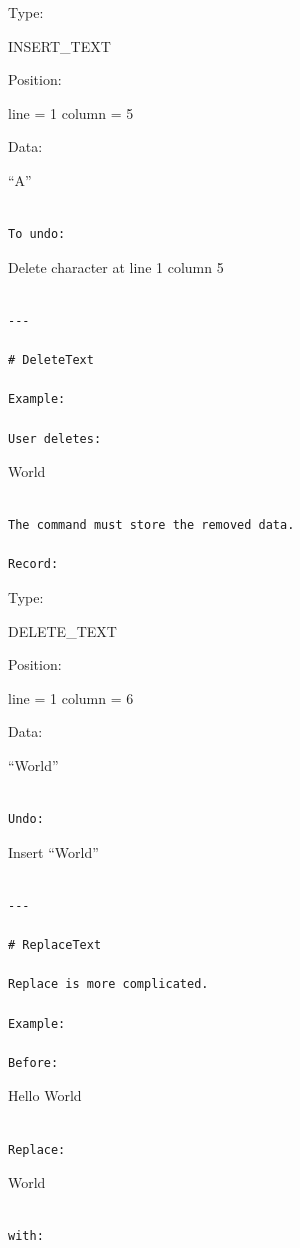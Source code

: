 \documentclass[
  oneside,
  openany]{book}
\begin{document}
Type:

INSERT\_TEXT

Position:

line = 1 column = 5

Data:

``A''

\begin{verbatim}

To undo:
\end{verbatim}

Delete character at line 1 column 5

\begin{verbatim}

---

# DeleteText

Example:

User deletes:
\end{verbatim}

World

\begin{verbatim}

The command must store the removed data.

Record:
\end{verbatim}

Type:

DELETE\_TEXT

Position:

line = 1 column = 6

Data:

``World''

\begin{verbatim}

Undo:
\end{verbatim}

Insert ``World''

\begin{verbatim}

---

# ReplaceText

Replace is more complicated.

Example:

Before:
\end{verbatim}

Hello World

\begin{verbatim}

Replace:
\end{verbatim}

World

\begin{verbatim}

with:
\end{verbatim}
\end{document}
